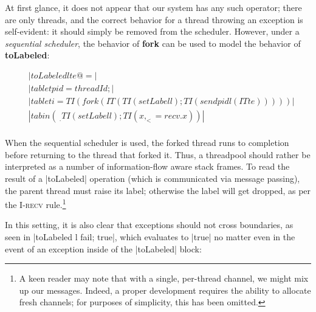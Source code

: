 At first glance, it does not appear that our system has any such operator;
there are only threads, and the correct behavior for a thread throwing
an exception is self-evident: it should simply be removed from the scheduler.
However, under a \emph{sequential scheduler}, the behavior of \textbf{fork}
can be used to model the behavior of \textbf{toLabeled}:

\begin{align*}
    & |toLabeled l te @= | \\
    & |tab let pid = threadId; | \\
    & |tab let i = TI (fork (IT (TI (setLabel l); TI (send pid l (IT te)))))| \\
    & |tab in (\ _ . TI (setLabel l); TI ( x, _ <= recv . x ))| \\
\end{align*}

When the sequential scheduler is used, the forked thread runs to
completion before returning to the thread that forked it.  Thus,
a threadpool should rather be interpreted as a number of information-flow
aware stack frames.  To read the result of a |toLabeled| operation
(which is communicated via message passing), the parent thread must raise
its label; otherwise the label will get dropped, as per the \textsc{I-recv} rule.\footnote{A keen reader may note that with a single, per-thread
channel, we might mix up our messages.  Indeed, a proper development requires
the ability to allocate fresh channels; for purposes of simplicity, this
has been omitted.}

In this setting, it is also clear that exceptions should not cross boundaries,
as seen in |toLabeled l fail; true|, which evaluates to |true| no matter even in
the event of an exception inside of the |toLabeled| block:







